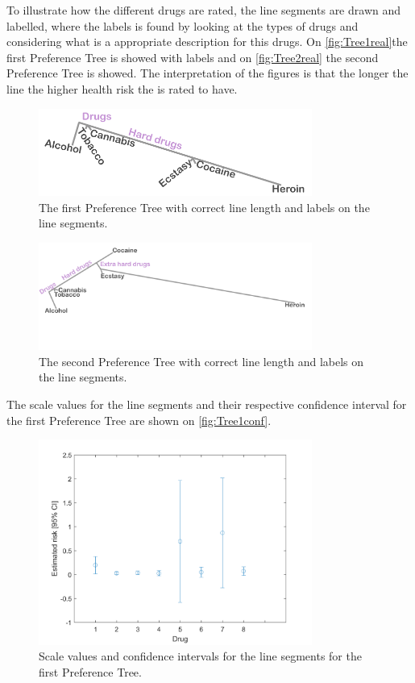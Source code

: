 \noindent 
%
To illustrate how the different drugs are rated, the line segments are drawn and labelled, where the labels is found by looking at the types of drugs and considering what is a appropriate description for this drugs. On \autoref{fig:Tree1real}the first Preference Tree is showed with labels and on \autoref{fig:Tree2real} the second Preference Tree is showed. The interpretation of the figures is that the longer the line the higher health risk the is rated to have.  
%
\begin{figure}[H]
\centering
\includegraphics[width = 0.80\textwidth]{Figure/Tree1real}
\caption{The first Preference Tree with correct line length and labels on the line segments.}
\label{fig:Tree1real}
\end{figure}
\noindent
%
\begin{figure}[H]
	\centering
	\includegraphics[width = 0.80\textwidth]{Figure/Tree2real}
	\caption{The second Preference Tree with correct line length and labels on the line segments.}
	\label{fig:Tree2real}
\end{figure}
\noindent
%
The scale values for the line segments and their respective confidence interval for the first Preference Tree are shown on \autoref{fig:Tree1conf}.
%
\begin{figure}[H]
	\centering
	\includegraphics[width = 0.80\textwidth]{Figure/confidense_p1220}
	\caption{Scale values and confidence intervals for the line segments for the first Preference Tree.}
	\label{fig:Tree1conf}
\end{figure}
